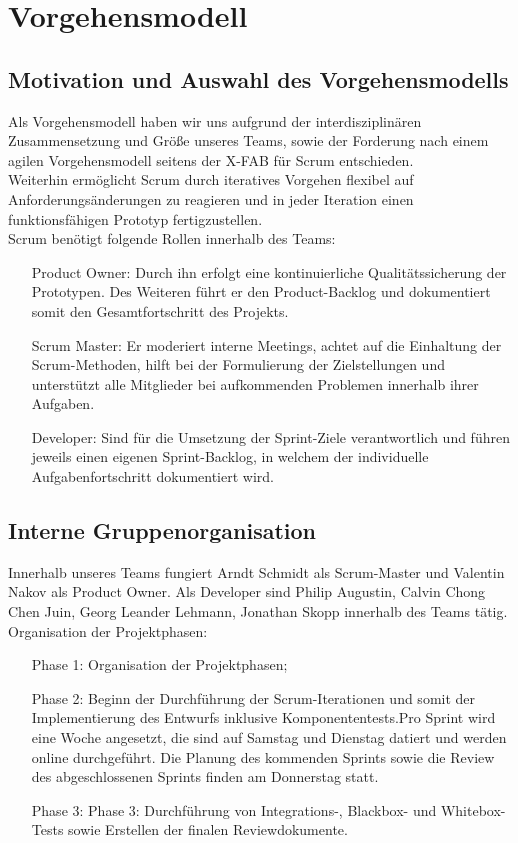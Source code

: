 \chapter{Vorgehensmodell}
\section{Motivation und Auswahl des Vorgehensmodells}

Als Vorgehensmodell haben wir uns aufgrund der interdisziplinären Zusammensetzung und Größe unseres Teams, sowie der Forderung nach einem agilen Vorgehensmodell seitens der X-FAB für Scrum entschieden.\\
Weiterhin ermöglicht Scrum durch iteratives Vorgehen flexibel auf Anforderungsänderungen zu reagieren und in jeder Iteration einen funktionsfähigen Prototyp fertigzustellen.\\

Scrum benötigt folgende Rollen innerhalb des Teams:
\begin{itemize}
	\item[Product Owner:] Durch ihn erfolgt eine kontinuierliche Qualitätssicherung der Prototypen. Des Weiteren führt er den Product-Backlog und dokumentiert somit den Gesamtfortschritt des Projekts.

	\item[Scrum Master:] Er moderiert interne Meetings, achtet auf die Einhaltung der Scrum-Methoden, hilft bei der Formulierung der Zielstellungen und unterstützt alle Mitglieder bei aufkommenden Problemen innerhalb ihrer Aufgaben.

	\item[Developer:]
	Sind für die Umsetzung der Sprint-Ziele verantwortlich und führen jeweils einen eigenen Sprint-Backlog, in welchem der individuelle Aufgabenfortschritt dokumentiert wird.

\end{itemize}

\section{Interne Gruppenorganisation}
Innerhalb unseres Teams fungiert Arndt Schmidt als Scrum-Master und Valentin Nakov als Product Owner. Als Developer sind Philip Augustin, Calvin Chong Chen Juin, Georg Leander Lehmann, Jonathan Skopp innerhalb des Teams tätig.\\
\clearpage
Organisation der Projektphasen:
\begin{itemize}
	\item[Phase 1:] Organisation der Projektphasen;
	\item[Phase 2:] Beginn der Durchführung der Scrum-Iterationen und somit der Implementierung des Entwurfs inklusive Komponententests.Pro Sprint wird eine Woche angesetzt, die  sind auf Samstag und Dienstag datiert und werden online durchgeführt. Die Planung des kommenden Sprints sowie die Review des abgeschlossenen Sprints finden am Donnerstag statt.
	\item[Phase 3:] Phase 3: Durchführung von Integrations-, Blackbox- und Whitebox-Tests sowie Erstellen der finalen Reviewdokumente.


\end{itemize}
\clearpage
